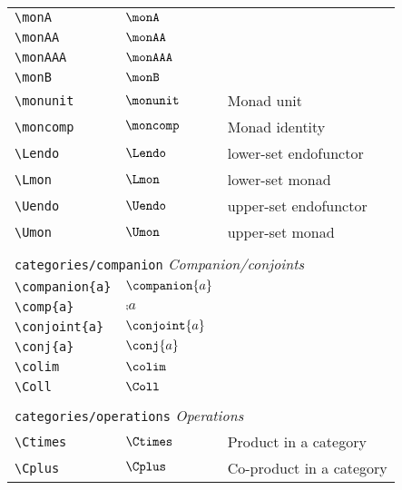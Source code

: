 \begin{longtable}{lll}
 \hline
{\color[rgb]{0.5,0.5,0.5}\texttt{\textbackslash monA}} & $\monA$ & \\ 
 {\color[rgb]{0.5,0.5,0.5}\texttt{\textbackslash monAA}} & $\monAA$ & \\ 
 {\color[rgb]{0.5,0.5,0.5}\texttt{\textbackslash monAAA}} & $\monAAA$ & \\ 
 {\color[rgb]{0.5,0.5,0.5}\texttt{\textbackslash monB}} & $\monB$ & \\ 
 {\color[rgb]{0.5,0.5,0.5}\texttt{\textbackslash monunit}} & $\monunit$ &  Monad unit\\ 
 {\color[rgb]{0.5,0.5,0.5}\texttt{\textbackslash moncomp}} & $\moncomp$ &  Monad identity\\ 
 {\color[rgb]{0.5,0.5,0.5}\texttt{\textbackslash Lendo}} & $\Lendo$ &  lower-set endofunctor\\ 
 {\color[rgb]{0.5,0.5,0.5}\texttt{\textbackslash Lmon}} & $\Lmon$ &  lower-set monad\\ 
 {\color[rgb]{0.5,0.5,0.5}\texttt{\textbackslash Uendo}} & $\Uendo$ &  upper-set endofunctor\\ 
 {\color[rgb]{0.5,0.5,0.5}\texttt{\textbackslash Umon}} & $\Umon$ &  upper-set monad\\ 
  &  & \\ 
 \multicolumn{3}{l}{{\color[rgb]{0.5,0.5,0.5}\texttt{categories/companion}} \emph{Companion/conjoints}}\\ 
 \hline
{\color[rgb]{0.5,0.5,0.5}\texttt{\textbackslash companion\{a\}}} & $\companion{a}$ & \\ 
 {\color[rgb]{0.5,0.5,0.5}\texttt{\textbackslash comp\{a\}}} & $\comp{a}$ & \\ 
 {\color[rgb]{0.5,0.5,0.5}\texttt{\textbackslash conjoint\{a\}}} & $\conjoint{a}$ & \\ 
 {\color[rgb]{0.5,0.5,0.5}\texttt{\textbackslash conj\{a\}}} & $\conj{a}$ & \\ 
 {\color[rgb]{0.5,0.5,0.5}\texttt{\textbackslash colim}} & $\colim$ & \\ 
 {\color[rgb]{0.5,0.5,0.5}\texttt{\textbackslash Coll}} & $\Coll$ & \\ 
  &  & \\ 
 \multicolumn{3}{l}{{\color[rgb]{0.5,0.5,0.5}\texttt{categories/operations}} \emph{Operations}}\\ 
 \hline
{\color[rgb]{0.5,0.5,0.5}\texttt{\textbackslash Ctimes}} & $\Ctimes$ &  Product in a category\\ 
 {\color[rgb]{0.5,0.5,0.5}\texttt{\textbackslash Cplus}} & $\Cplus$ &  Co-product in a category\\ 

\end{longtable}
